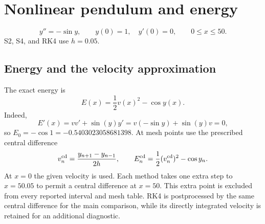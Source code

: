 \documentclass[11pt,a4paper]{article}
\begin{document}
\section{Nonlinear pendulum and energy}
\[
y''=-\sin y,\qquad y(0)=1,\quad y'(0)=0,\qquad0\le x\le50.
\]
S2, S4, and RK4 use $h=0.05$.
\subsection{Energy and the velocity approximation}
The exact energy is
\[
E(x)=\frac12 v(x)^2-\cos y(x).
\]
Indeed,
\[
E'(x)=vv'+\sin(y)y'=v(-\sin y)+\sin(y)v=0,
\]
so $E_0=-\cos1=-0.5403023058681398$.
At mesh points use the prescribed central difference
\[
v_n^{\rm cd}=\frac{y_{n+1}-y_{n-1}}{2h},\qquad
E_n^{\rm cd}=\frac12(v_n^{\rm cd})^2-\cos y_n.
\]
At $x=0$ the given velocity is used. Each method takes one extra step to
$x=50.05$ to permit a central difference at $x=50$. This extra point is
excluded from every reported interval and mesh table.
RK4 is postprocessed by the same central difference for the main comparison,
while its directly integrated velocity is retained for an additional diagnostic.
\end{document}
